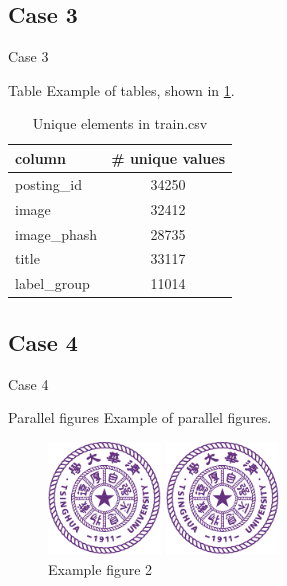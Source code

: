 \documentclass{beamer}
\begin{document}
\subsection{Case 3}

\begin{frame}{Case 3}
  \begin{block}{Table}
    Example of tables, shown in \ref{tab:unique_values}. 

    \begin{table}[htbp]
      \small
      \centering
      \caption{Unique elements in train.csv }
      \label{tab:unique_values}
      \begin{tabular}{lc}
        \toprule
        column & \# unique values \\
        \midrule
        posting\_id & 34250 \\
        image & 32412 \\
        image\_phash & 28735 \\
        title & 33117 \\
        label\_group & 11014 \\
        \bottomrule
      \end{tabular}
    \end{table}
  \end{block}
\end{frame}

\subsection{Case 4}

\begin{frame}{Case 4}
  \begin{block}{Parallel figures}
    Example of parallel figures.
  \end{block}
  \begin{figure}[htbp]
    \centering
    \begin{minipage}[t]{0.48\textwidth}
      \centering
      \includegraphics[width=3cm]{thulogo.pdf}
      \caption{Example figure 1}
      \label{fig:left_side}
    \end{minipage}
    \begin{minipage}[t]{0.48\textwidth}
      \centering
      \includegraphics[width=3cm]{thulogo.pdf}
      \caption{Example figure 2}
      \label{fig:right_side}
    \end{minipage}
  \end{figure}
\end{frame}
\end{document}
